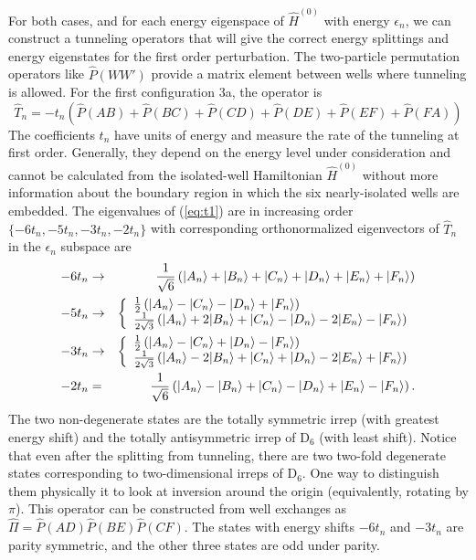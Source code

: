For both cases, and for each energy eigenspace of $\hat{H}^{(0)}$ with energy $\epsilon_n$, we can construct a tunneling operators that will give the correct energy splittings and energy eigenstates for the first order perturbation. The two-particle permutation operators like $\hat{P}(WW')$ provide a matrix element between wells where tunneling is allowed. For the first configuration 3a, the operator is
\begin{equation}\label{eq:t1}
\hat{T}_n = -t_n \left( \hat{P}(AB) + \hat{P}(BC) + \hat{P}(CD) + \hat{P}(DE) + \hat{P}(EF) + \hat{P}(FA) \right)
\end{equation}
The coefficients $t_n$ have units of energy and measure the rate of the tunneling at first order. Generally, they depend on the energy level under consideration and cannot be calculated from the isolated-well Hamiltonian $\hat{H}^{(0)}$ without more information about the boundary region in which the six nearly-isolated wells are embedded. The eigenvalues of (\ref{eq:t1}) are in increasing order $\{-6 t_n, -5 t_n,  -3 t_n,  -2t_n\}$ with corresponding orthonormalized eigenvectors of $\hat{T}_n$ in the $\epsilon_n$ subspace are
\begin{eqnarray*}
-6 t_n &\to& \frac{1}{\sqrt{6}} \left(|A_n\rangle+|B_n\rangle+|C_n\rangle+|D_n\rangle+|E_n\rangle+|F_n\rangle\right)\\
-5 t_n &\to& \left\{\begin{array}{l}
\frac{1}{2} \left(|A_n\rangle- |C_n\rangle - |D_n\rangle +|F_n\rangle\right)\\
\frac{1}{2\sqrt{3}} \left(|A_n\rangle+2|B_n\rangle+|C_n\rangle-|D_n\rangle-2|E_n\rangle-|F_n\rangle\right)
\end{array} \right.\\
-3 t_n &\to& \left\{\begin{array}{l} \frac{1}{2} \left(|A_n\rangle- |C_n\rangle + |D_n\rangle -|F_n\rangle\right)\\
\frac{1}{2\sqrt{3}} \left(|A_n\rangle-2|B_n\rangle+|C_n\rangle+|D_n\rangle-2|E_n\rangle+|F_n\rangle\right) \end{array} \right.\\
-2 t_n &=& \frac{1}{\sqrt{6}} \left(|A_n\rangle-|B_n\rangle+|C_n\rangle-|D_n\rangle+|E_n\rangle-|F_n\rangle\right).
\end{eqnarray*}
The two non-degenerate states are the totally symmetric irrep (with greatest energy shift) and the totally antisymmetric irrep of $\mathrm{D}_6$ (with least shift). Notice that even after the splitting from tunneling, there are two two-fold degenerate states corresponding to two-dimensional irreps of $\mathrm{D}_6$. One way to distinguish them physically it to look at inversion around the origin (equivalently, rotating by $\pi$). This operator can be constructed from well exchanges as $\hat{\Pi}=\hat{P}(AD)\hat{P}(BE)\hat{P}(CF)$. The states with energy shifts $-6t_n$ and $-3t_n$ are parity symmetric, and the other three states are odd under parity.

